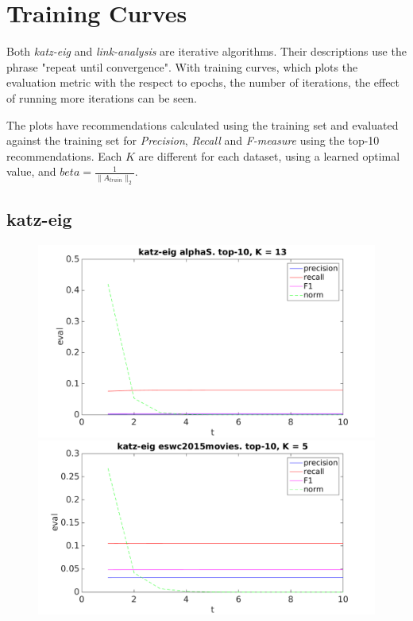 
\section{Training Curves}\label{sec:graphs:training_curves}

Both \textit{katz-eig} and \textit{link-analysis} are iterative algorithms. Their descriptions use the phrase "repeat until convergence".  With training curves, which plots the evaluation metric with the respect to epochs, the number of iterations, the effect of running more iterations can be seen.

The plots have recommendations calculated using the training set and evaluated against the training set for \textit{Precision}, \textit{Recall} and \textit{F-measure} using the top-10 recommendations. Each $K$ are different for each dataset, using a learned optimal value, and $beta = \frac{1}{\|A_{train}\|_2}$.

\subsection{katz-eig}

\FloatBarrier

\begin{figure}[h!]
\centering
\begin{minipage}{.5\textwidth}
    \centering
    \includegraphics[width=\linewidth]{fig/katzeig_t/alphaS_katzeig_t.png}
\end{minipage}%
\begin{minipage}{.5\textwidth}
    \centering
    \includegraphics[width=\linewidth]{fig/katzeig_t/eswc2015movies_katzeig_t.png}
\end{minipage}
\end{figure}

